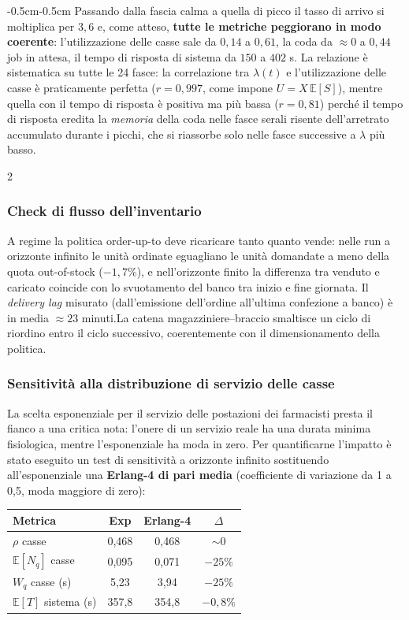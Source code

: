 \documentclass{article}
\begin{document}
\begin{adjustwidth}{-0.5cm}{-0.5cm}
Passando dalla fascia calma a quella di picco il tasso di arrivo si moltiplica per $3{,}6$ e, come
atteso, \textbf{tutte le metriche peggiorano in modo coerente}: l'utilizzazione delle casse sale da
$0{,}14$ a $0{,}61$, la coda da $\approx 0$ a $0{,}44$ job in attesa, il tempo di risposta di
sistema da $150$ a $402$ s. La relazione è sistematica su tutte le 24 fasce: la correlazione tra
$\lambda(t)$ e l'utilizzazione delle casse è praticamente perfetta ($r = 0{,}997$, come impone
$U = X\,\mathbb{E}[S]$), mentre quella con il tempo di risposta è positiva ma più bassa
($r = 0{,}81$) perché il tempo di risposta eredita la \emph{memoria} della coda nelle fasce
serali risente dell'arretrato accumulato durante i picchi, che si riassorbe solo nelle fasce
successive a $\lambda$ più basso. 
\begin{multicols}{2}
\subsubsection*{Check di flusso dell'inventario}
A regime la politica order-up-to deve ricaricare tanto quanto vende: nelle run a orizzonte
infinito le unità ordinate eguagliano le unità domandate a meno della quota out-of-stock
($-1{,}7\%$), e nell'orizzonte finito la differenza tra venduto e caricato coincide con lo
svuotamento del banco tra inizio e fine giornata. Il \emph{delivery lag} misurato (dall'emissione
dell'ordine all'ultima confezione a banco) è in media $\approx 23$ minuti.La catena magazziniere--braccio smaltisce un ciclo di riordino entro il
ciclo successivo, coerentemente con il dimensionamento della politica.

\subsubsection*{Sensitività alla distribuzione di servizio delle casse}
La scelta esponenziale per il servizio delle postazioni dei farmacisti presta il fianco a una critica nota: l'onere
di un servizio reale ha una durata minima fisiologica, mentre l'esponenziale ha moda in zero. Per
quantificarne l'impatto è stato eseguito un test di sensitività a orizzonte infinito sostituendo
all'esponenziale una \textbf{Erlang-4 di pari media} (coefficiente di variazione da 1 a 0{,}5,
moda maggiore di zero):

\begin{center}
\renewcommand{\arraystretch}{1.2}
\begin{tabular}{|l|c|c|c|}
\hline
\textbf{Metrica} & \textbf{Exp} & \textbf{Erlang-4} & $\Delta$ \\
\hline
$\rho$ casse            & 0{,}468 & 0{,}468 & $\sim 0$ \\
$\mathbb{E}[N_q]$ casse & 0{,}095 & 0{,}071 & $-25\%$ \\
$W_q$ casse (s)         & 5{,}23  & 3{,}94  & $-25\%$ \\
$\mathbb{E}[T]$ sistema (s) & 357{,}8 & 354{,}8 & $-0{,}8\%$ \\
\hline
\end{tabular}
\end{center}


\end{multicols}
\end{adjustwidth}
\end{document}

